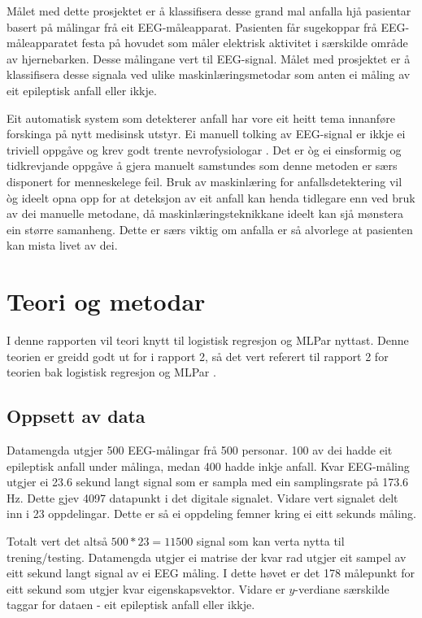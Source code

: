 \documentclass[oneside, nynorsk]{book}
\begin{document}
Målet med dette prosjektet er å klassifisera desse grand mal anfalla hjå pasientar basert på målingar frå eit EEG-måleapparat.
Pasienten får sugekoppar frå EEG-måleapparatet festa på hovudet som måler elektrisk aktivitet i særskilde område av hjernebarken. Desse målingane vert til EEG-signal.
Målet med prosjektet er å klassifisera desse signala ved ulike maskinlæringsmetodar som anten ei måling av eit epileptisk anfall eller ikkje.

Eit automatisk system som detekterer anfall har vore eit heitt tema innanføre forskinga på nytt medisinsk utstyr.
Ei manuell tolking av EEG-signal er ikkje ei triviell oppgåve og krev godt trente nevrofysiologar \cite{Epil4}.
Det er òg ei einsformig og tidkrevjande oppgåve å gjera manuelt samstundes som denne metoden er særs disponert for menneskelege feil.
Bruk av maskinlæring for anfallsdetektering vil òg ideelt opna opp for at deteksjon av eit anfall kan henda tidlegare enn ved bruk av dei manuelle metodane, då
maskinlæringsteknikkane ideelt kan sjå mønstera ein større samanheng.
Dette er særs viktig om anfalla er så alvorlege at pasienten kan mista livet av dei.
\chapter{Teori og metodar}                  %
I denne rapporten vil teori knytt til logistisk regresjon og MLPar nyttast.
Denne teorien er greidd godt ut for i rapport 2, så det vert referert til
rapport 2 for teorien bak logistisk regresjon og MLPar \cite{Naess}.
\section{Oppsett av data}
Datamengda utgjer 500 EEG-målingar frå 500 personar. 100 av dei hadde eit epileptisk anfall under målinga, medan 400
hadde inkje anfall. Kvar EEG-måling utgjer ei 23.6 sekund langt signal som er sampla med ein samplingsrate på 173.6 Hz.
Dette gjev 4097 datapunkt i det digitale signalet. Vidare vert signalet delt inn i 23 oppdelingar.
Dette er så ei oppdeling femner kring ei eitt sekunds måling.

Totalt vert det altså $500*23=11500$ signal som kan verta nytta til trening/testing.
Datamengda utgjer ei matrise der kvar rad utgjer eit sampel av eitt sekund langt signal av ei EEG måling.
I dette høvet er det 178 målepunkt for eitt sekund som utgjer kvar eigenskapsvektor.
Vidare er $y$-verdiane særskilde taggar for dataen - eit epileptisk anfall eller ikkje.
\end{document}
